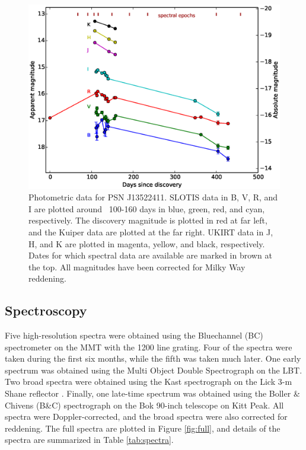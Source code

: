 \documentclass[a4paper,fleqn,usenatbib]{mnras}
\begin{document}
\begin{figure}
  \includegraphics[width=\linewidth]{graphics/multi_full_spectra_labels.eps}
  \caption{Photometric data for PSN J13522411. SLOTIS data in B, V, R, and I are plotted around ~100-160 days in blue, green, red, and cyan, respectively. The discovery magnitude is plotted in red at far left, and the Kuiper data are plotted at the far right. UKIRT data in J, H, and K are plotted in magenta, yellow, and black, respectively. Dates for which spectral data are available are marked in brown at the top. All magnitudes have been corrected for Milky Way reddening.}
  \label{fig:curve}
\end{figure}

\subsection{Spectroscopy} \label{obs:spec}
Five high-resolution spectra were obtained using the Bluechannel (BC) spectrometer on the MMT with the 1200 line grating. Four of the spectra were taken during the first six months, while the fifth was taken much later. One early spectrum was obtained using the Multi Object Double Spectrograph \citep[MODS;][]{Bya00} on the LBT. Two broad spectra were obtained using the Kast spectrograph on the Lick 3-m Shane reflector \citep{Mil93}. Finally, one late-time spectrum was obtained using the Boller \& Chivens (B\&C) spectrograph on the Bok 90-inch telescope on Kitt Peak. All spectra were Doppler-corrected, and the broad spectra were also corrected for reddening. The full spectra are plotted in Figure \ref{fig:full}, and details of the spectra are summarized in Table \ref{tab:spectra}.
\end{document}
